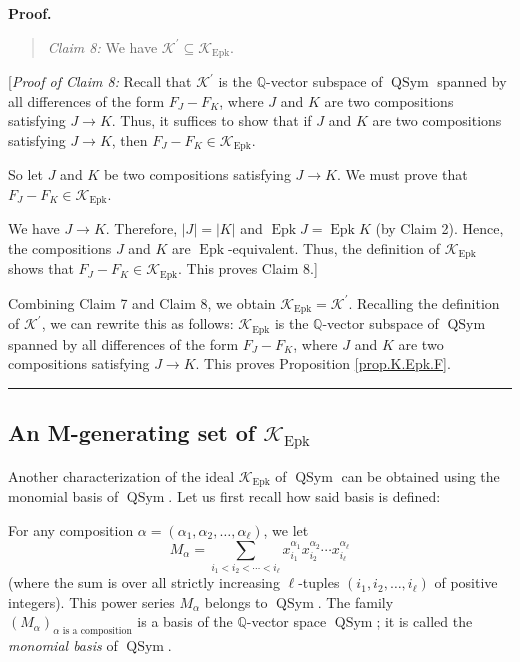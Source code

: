 \documentclass[numbers=enddot,12pt,final,onecolumn,notitlepage]{scrartcl}%
\theoremstyle{definition}
\newenvironment{statement}{\begin{quote}}{\end{quote}}
\newenvironment{proof}[1][Proof]{\noindent\textbf{#1.} }{\ \rule{0.5em}{0.5em}}
\newenvironment{verlong}{}{}
\let\sumnonlimits\sum
\renewcommand{\sum}{\sumnonlimits\limits}
\begin{document}
\begin{verlong}
\begin{proof}
\begin{statement}
\textit{Claim 8:} We have $\mathcal{K}^{\prime}\subseteq\mathcal{K}%
_{\operatorname*{Epk}}$.
\end{statement}

[\textit{Proof of Claim 8:} Recall that $\mathcal{K}^{\prime}$ is the
$\mathbb{Q}$-vector subspace of $\operatorname*{QSym}$ spanned by all
differences of the form $F_{J}-F_{K}$, where $J$ and $K$ are two compositions
satisfying $J\rightarrow K$. Thus, it suffices to show that if $J$ and $K$ are
two compositions satisfying $J\rightarrow K$, then $F_{J}-F_{K}\in
\mathcal{K}_{\operatorname*{Epk}}$.

So let $J$ and $K$ be two compositions satisfying $J\rightarrow K$. We must
prove that $F_{J}-F_{K}\in\mathcal{K}_{\operatorname*{Epk}}$.

We have $J\rightarrow K$. Therefore, $\left|J\right| = \left|K\right|$ and
$\operatorname{Epk} J = \operatorname{Epk} K$ (by Claim 2).
Hence, the compositions $J$ and $K$ are $\operatorname{Epk}$-equivalent.
Thus, the definition of $\mathcal{K}_{\operatorname*{Epk}}$ shows that
$F_{J}-F_{K} \in \mathcal{K}_{\operatorname*{Epk}}$.
This proves Claim 8.]

Combining Claim 7 and Claim 8, we obtain $\mathcal{K}_{\operatorname*{Epk}%
}=\mathcal{K}^{\prime}$. Recalling the definition of $\mathcal{K}^{\prime}$,
we can rewrite this as follows: $\mathcal{K}_{\operatorname*{Epk}}$ is the
$\mathbb{Q}$-vector subspace of $\operatorname*{QSym}$ spanned by all
differences of the form $F_{J}-F_{K}$, where $J$ and $K$ are two compositions
satisfying $J\rightarrow K$. This proves Proposition \ref{prop.K.Epk.F}.
\end{proof}
\end{verlong}

\subsection{An M-generating set of $\mathcal{K}_{\operatorname*{Epk}}$}

Another characterization of the ideal $\mathcal{K}_{\operatorname*{Epk}}$ of
$\operatorname*{QSym}$ can be obtained using the monomial basis of
$\operatorname*{QSym}$. Let us first recall how said basis is defined:

For any composition $\alpha=\left(  \alpha_{1},\alpha_{2},\ldots,\alpha_{\ell
}\right)  $, we let%
\[
M_{\alpha}=\sum_{i_{1}<i_{2}<\cdots<i_{\ell}}x_{i_{1}}^{\alpha_{1}}x_{i_{2}%
}^{\alpha_{2}}\cdots x_{i_{\ell}}^{\alpha_{\ell}}%
\]
(where the sum is over all strictly increasing $\ell$-tuples $\left(
i_{1},i_{2},\ldots,i_{\ell}\right)  $ of positive integers). This power series
$M_{\alpha}$ belongs to $\operatorname*{QSym}$. The family $\left(  M_{\alpha
}\right)  _{\alpha\text{ is a composition}}$ is a basis of the $\mathbb{Q}%
$-vector space $\operatorname*{QSym}$; it is called the \textit{monomial
basis} of $\operatorname*{QSym}$.
\end{document}
